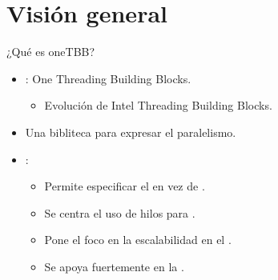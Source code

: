 \section{Visión general}

\begin{frame}[t]{¿Qué es oneTBB?}
\begin{itemize}
  \item {}: One Threading Building Blocks.
    \begin{itemize}
      \item Evolución de Intel Threading Building Blocks.
    \end{itemize}

  \item Una bibliteca para expresar el paralelismo.

  \item {}:
    \begin{itemize}
      \item Permite especificar el  en
            vez de .
      \item Se centra el uso de hilos para .
      \item Pone el foco en la escalabilidad en el .
      \item Se apoya fuertemente en la .
    \end{itemize}
\end{itemize}
\end{frame}

